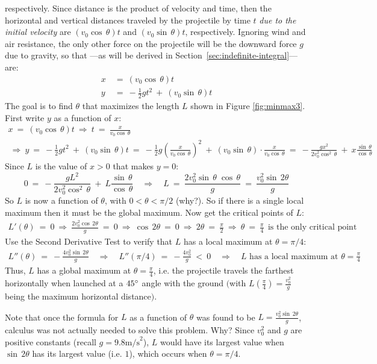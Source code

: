 \begin{exmp}
respectively. Since distance is the product of velocity and time, then the
horizontal and vertical distances traveled by the projectile by time $t$ \emph{due
to the initial velocity} are
$(v_0 \cos\,\theta)t$ and $(v_0 \sin\,\theta)t$, respectively. Ignoring wind and
air resistance, the only other force on the projectile will be the downward force
$g$ due to gravity, so that ---as will be derived in
Section~\ref{sec:indefinite-integral}---are:
\begin{align*}
 x ~&=~ (v_0 \cos\,\theta)t\\
 y ~&=~ -\frac{1}{2}gt^2 ~+~ (v_0 \sin\,\theta)t
\end{align*}
The goal is to find $\theta$ that maximizes the length $L$ shown in Figure
\ref{fig:minmax3}. First write $y$ as a function of $x$:
\begin{gather}
x ~=~ (v_0 \cos\,\theta)t ~\Rightarrow~ t ~=~ \frac{x}{v_0 \cos\,\theta} \nonumber\\
~\Rightarrow~ y ~=~ -\frac{1}{2}gt^2 ~+~ (v_0 \sin\,\theta)t ~=~ -\frac{1}{2}g\left(\frac{x}{v_0 \cos\,\theta}\right)^2
 ~+~ (v_0 \sin\,\theta) \cdot \frac{x}{v_0 \cos\,\theta} ~=~ -\frac{gx^2}{2v_0^2 \cos^2\,\theta} ~+~ x\frac{\sin\,\theta}{\cos\,\theta}
\label{eqn:exmp_minmax3}
\end{gather}
Since $L$ is the value of $x>0$ that makes $y=0$:
\[
0 ~=~ -\frac{gL^2}{2v_0^2 \cos^2\,\theta} ~+~ L\frac{\sin\,\theta}{\cos\,\theta}
\quad\Rightarrow\quad L ~=~ \frac{2v_0^2 \sin\,\theta\;\cos\,\theta}{g} ~=~
\frac{v_0^2 \sin\,2\theta}{g}
\]
So $L$ is now a function of $\theta$, with $0 < \theta < \pi/2$ (why?). So if
there is a single local maximum then it must be the global maximum. Now get
the critical points of $L$:
\begin{gather*}
L'(\theta) ~=~ 0 ~\Rightarrow~ \frac{2v_0^2 \cos\,2\theta}{g} ~=~ 0
~\Rightarrow~ \cos\,2\theta ~=~ 0
~\Rightarrow~ 2\theta ~=~ \frac{\pi}{2}
~\Rightarrow~ \theta ~=~ \frac{\pi}{4} ~~\text{is the only critical point}
\end{gather*}
Use the Second Derivative Test to verify that $L$ has a local maximum at
$\theta = \pi/4$:
\begin{align*}
L''(\theta) ~=~ -\frac{4v_0^2 \sin\,2\theta}{g}
\quad\Rightarrow\quad L''(\pi/4) ~=~ -\frac{4v_0^2}{g} ~<~ 0 \quad\Rightarrow\quad \text{$L$ has a local maximum at $\theta = \frac{\pi}{4}$}
\end{align*}
Thus, $L$ has a global maximum at $\theta = \frac{\pi}{4}$, i.e. the projectile
travels the farthest horizontally when launched at a $45^\circ$ angle with the
ground $\bigg($with $L\left(\frac{\pi}{4}\right) = \frac{v_0^2}{g}$ being the maximum
horizontal distance$\bigg)$.\vspace{2mm}

\par\noindent Note that once the formula for $L$ as a function of $\theta$ was
found to be $L = \frac{v_0^2 \sin\,2\theta}{g}$, calculus was not actually
needed to solve this problem. Why? Since $v_0^2$ and $g$ are positive
constants (recall $g = 9.8 \text{m/s}^2$), $L$ would have its largest value
when $\sin\,2\theta$ has its largest value (i.e. $1$), which occurs when
$\theta = \pi/4$.
\end{exmp}
